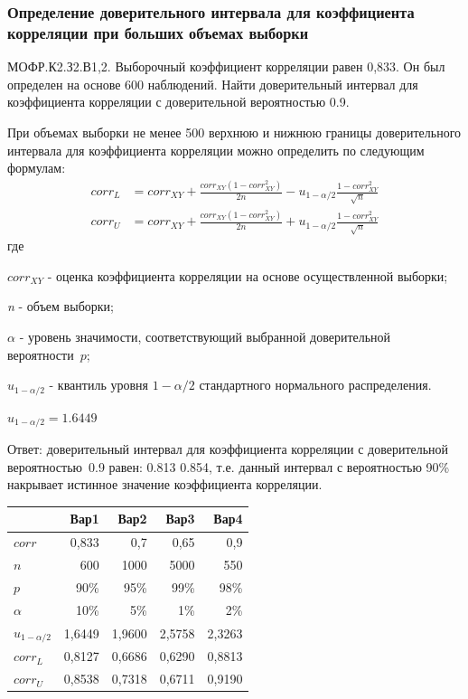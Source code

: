 \documentclass[12pt, table, a4paper,twoside]{exam}
\begin{document}
\begin{questions}
\begin{solution}[6em]
\end{solution}

\subsubsection{Определение доверительного интервала для коэффициента корреляции при больших объемах выборки}
\question[10] МОФР.К2.З2.В1,2. Выборочный коэффициент корреляции равен 0,833. Он был определен на основе 600 наблюдений. Найти доверительный интервал для коэффициента корреляции с доверительной вероятностью 0.9.

\begin{solution}[6em]

\raggedright
При объемах выборки не менее 500 верхнюю и нижнюю границы доверительного интервала для коэффициента корреляции можно определить по следующим формулам:
\begin{align}
corr_L&=corr_{XY}+\frac{corr_{XY}(1-corr_{XY}^2)}{2n}-u_{1-\alpha/2}\frac{1-corr_{XY}^2}{\sqrt{n}}\\
corr_U&=corr_{XY}+\frac{corr_{XY}(1-corr_{XY}^2)}{2n}+u_{1-\alpha/2}\frac{1-corr_{XY}^2}{\sqrt{n}}
\end{align}
где

$corr_{XY}$ - оценка коэффициента корреляции на основе осуществленной выборки;

\textit{n} - объем выборки;

$\alpha$ - уровень значимости, соответствующий выбранной доверительной вероятности~$p$;

$u_{1-\alpha/2}$ - квантиль уровня $1-\alpha/2$ стандартного нормального распределения.

	$u_{1-\alpha/2}=1.6449$	


Ответ: доверительный интервал для коэффициента корреляции с доверительной вероятностью~0.9 равен: 0.813 0.854, т.е. данный интервал с вероятностью 90\% накрывает истинное значение коэффициента корреляции.

\centering
\begin{tabular}{lrrrr}
	\toprule
	                 &   Вар1 &   Вар2 &   Вар3 &   Вар4 \\ \midrule
	$corr$           &  0,833 &    0,7 &   0,65 &    0,9 \\
	$n$              &    600 &   1000 &   5000 &    550 \\
	$p$              &   90\% &   95\% &   99\% &   98\% \\ \midrule
	$\alpha$         &   10\% &    5\% &    1\% &    2\% \\
	$u_{1-\alpha/2}$ & 1,6449 & 1,9600 & 2,5758 & 2,3263 \\
	$corr_L$         & 0,8127 & 0,6686 & 0,6290 & 0,8813 \\
	$corr_U$         & 0,8538 & 0,7318 & 0,6711 & 0,9190 \\ \bottomrule
\end{tabular}%


\end{solution}
\end{questions}
\end{document}
